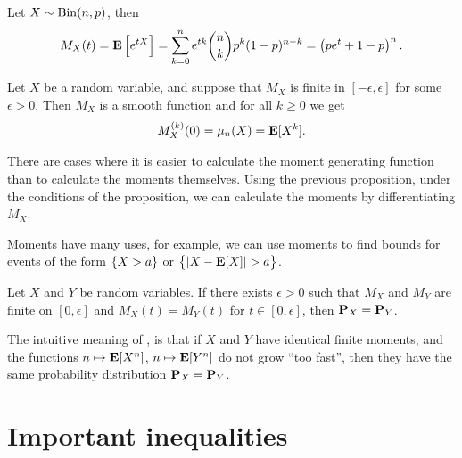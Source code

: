 \documentclass[11pt,a4paper]{article}
\begin{document}
\begin{example}
  Let $X \sim \operatorname{Bin}(n,p)$, then
  \[
    M_X(t) =
    \mathbf{E}\left[e^{tX}\right] =
    \sum_{k=0}^{n}e^{t k}{\binom{n}{k}}p^{k}(1-p)^{n-k} =
    \left(p e^{t}+1-p\right)^{n}.
  \]
\end{example}

\begin{proposition}
  \label{prop:moments-and-mgf}
  Let $X$ be a random variable, and suppose that $M_X$ is finite in 
  $[-\epsilon, \epsilon]$ for some $\epsilon > 0$. Then $M_X$ is a smooth
  function and for all $k \geq 0$ we get
  \[
    M_X^{(k)}(0) = \mu_n(X) = \mathbf{E}[X^k].
  \]
\end{proposition}

\begin{remark}
  There are cases
  where it is easier to calculate the moment generating function than
  to calculate the moments themselves.
  Using the previous proposition, under the conditions
  of the proposition, we can calculate
  the moments by differentiating $M_X$.
\end{remark}

\begin{remark}
  Moments have many uses,
  for example, we can use moments to find bounds for events of the
  form $\left\{X > a\right\}$ or $\left\{|X - \mathbf{E}[X]| > a\right\}$.
\end{remark}

\begin{proposition}
  \label{prop:moments-and-xy}
  Let $X$ and $Y$ be random variables.
  If there exists $\epsilon > 0$ such that 
  $M_X$ and $M_Y$ are finite on $[0,\epsilon]$ and $M_X(t) = M_Y(t)$
  for $t \in [0,\epsilon]$, then $\mathbf{P}_X = \mathbf{P}_Y$.
\end{proposition}

\begin{remark}
  The intuitive meaning of ,
  is that if $X$ and $Y$ have identical finite moments,
  and the functions $n \mapsto \mathbf{E}[X^n]$, $n \mapsto \mathbf{E}[Y^n]$
  do not grow ``too fast'',
  then they have the same probability distribution $\mathbf{P}_X = \mathbf{P}_Y$.
\end{remark}

\newpage

\section{Important inequalities}
\end{document}

